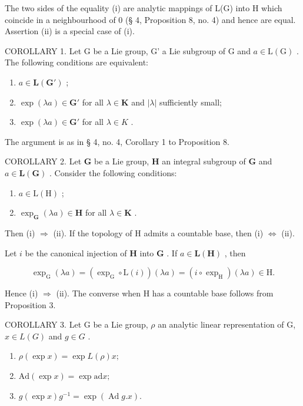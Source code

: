 The two sides of the equality (i) are analytic mappings of L(G) into H which coincide in a neighbourhood of 0 (§ 4, Proposition 8, no. 4) and hence are equal. Assertion (ii) is a special case of (i).

COROLLARY 1. Let G be a Lie group, G' a Lie subgroup of G and \(a \in \mathrm{L}(\mathrm{G})\) . The following conditions are equivalent:

\begin{enumerate}
\def\labelenumi{(\roman{enumi})}
\item
  \(a \in \mathbf{L}(\mathbf{G}')\) ;
\item
  \(\exp (\lambda a)\in \mathbf{G}'\) for all \(\lambda \in \mathbf{K}\) and \(|\lambda |\) sufficiently small;
\item
  \(\exp(\lambda a) \in \mathbf{G}'\) for all \(\lambda \in K\) .
\end{enumerate}

The argument is as in § 4, no. 4, Corollary 1 to Proposition 8.

COROLLARY 2. Let \(\mathbf{G}\) be a Lie group, \(\mathbf{H}\) an integral subgroup of \(\mathbf{G}\) and \(a \in \mathbf{L}(\mathbf{G})\) . Consider the following conditions:

\begin{enumerate}
\def\labelenumi{(\roman{enumi})}
\item
  \(a \in \mathrm{L}(\mathrm{H})\) ;
\item
  \(\exp_{\mathbf{G}}(\lambda a)\in \mathbf{H}\) for all \(\lambda \in \mathbf{K}\) .
\end{enumerate}

Then (i) \(\Rightarrow\) (ii). If the topology of H admits a countable base, then (i) \(\Leftrightarrow\) (ii).

Let \(i\) be the canonical injection of \(\mathbf{H}\) into \(\mathbf{G}\) . If \(a \in \mathbf{L}(\mathbf{H})\) , then

\[
\exp_ {\mathrm{G}} (\lambda a) = \left(\exp_ {\mathrm{G}} \circ \mathrm{L} (i)\right) (\lambda a) = (i \circ \exp_ {\mathrm{H}}) (\lambda a) \in \mathrm{H}.
\]

Hence (i) \(\Rightarrow\) (ii). The converse when H has a countable base follows from Proposition 3.

COROLLARY 3. Let G be a Lie group, \(\rho\) an analytic linear representation of G, \(x \in L(G)\) and \(g \in G\) .

\begin{enumerate}
\def\labelenumi{(\roman{enumi})}
\item
  \(\rho(\exp x) = \exp L(\rho)x;\)
\item
  \(\mathrm{Ad}(\exp x) = \exp \mathrm{ad} x;\)
\item
  \(g(\exp x)g^{-1} = \exp(\operatorname{Ad} g.x).\)
\end{enumerate}

